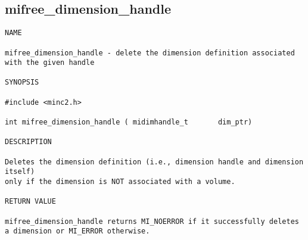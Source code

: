 \documentclass{article}
\begin{document}
\subsection{mifree\_dimension\_handle}
\begin{verbatim}
NAME

mifree_dimension_handle - delete the dimension definition associated 
with the given handle

SYNOPSIS

#include <minc2.h>

int mifree_dimension_handle ( midimhandle_t       dim_ptr)

DESCRIPTION

Deletes the dimension definition (i.e., dimension handle and dimension itself)
only if the dimension is NOT associated with a volume.

RETURN VALUE

mifree_dimension_handle returns MI_NOERROR if it successfully deletes 
a dimension or MI_ERROR otherwise.
\end{verbatim}
\end{document}
